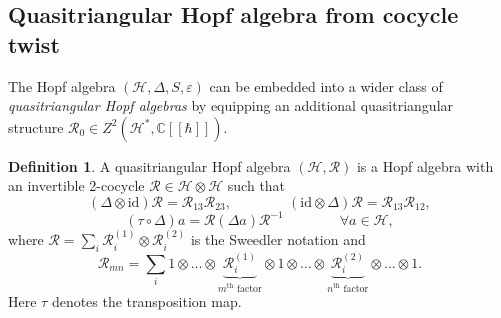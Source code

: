 \documentclass[reqno]{amsart}
\theoremstyle{definition}
\newtheorem{definition}[formula]{Definition}
\theoremstyle{remark}
\begin{document}
\subsection{Quasitriangular Hopf algebra from cocycle twist}
The Hopf algebra $\left(\mathscr{H},\Delta,S,\varepsilon\right)$ can be embedded into a wider class of \textit{quasitriangular Hopf algebras} by equipping an additional quasitriangular structure $\mathcal{R}_0 \in Z^2\left(\mathscr{H}^*,\mathbb{C}[[\hbar]]\right)$.
\begin{definition}
    A quasitriangular Hopf algebra $(\mathscr{H},\mathcal{R})$ is a Hopf algebra with an invertible 2-cocycle $\mathcal{R} \in \mathscr{H} \otimes \mathscr{H}$ such that
    \begin{equation}\label{eq1.def2.1}
       \left( {\Delta  \otimes {\text{id}}} \right)\mathcal{R} = {\mathcal{R}_{13}}{\mathcal{R}_{23}}, \qquad \qquad \left( {{\text{id}} \otimes \Delta } \right)\mathcal{R} = {\mathcal{R}_{13}}{\mathcal{R}_{12}},
    \end{equation}
    \begin{equation}\label{eq2.def2.1}
        \left( {\tau  \circ \Delta } \right)a = \mathcal{R}\left( {\Delta a} \right){\mathcal{R}^{ - 1}} \qquad \qquad \forall a \in \mathscr{H},
    \end{equation}
    where $\mathcal{R} = \sum\limits_i {\mathcal{R}_i^{\left( 1 \right)} \otimes \mathcal{R}_i^{\left( 2 \right)}} $ is the Sweedler notation and 
    \begin{equation}
        {\mathcal{R}_{mn}} = \displaystyle\sum\limits_i {1 \otimes  \ldots  \otimes\underbrace{\mathcal{R}_i^{\left( 1 \right)} }_{m^{\textrm{th}} \textrm{ factor}}\otimes 1 \otimes  \ldots  \otimes\underbrace{ \mathcal{R}_i^{\left( 2 \right)}} _{n^{\textrm{th}} \textrm{ factor}}\otimes  \ldots  \otimes 1} .
    \end{equation}
    Here $\tau$ denotes the transposition map.
\end{definition}
\end{document}
